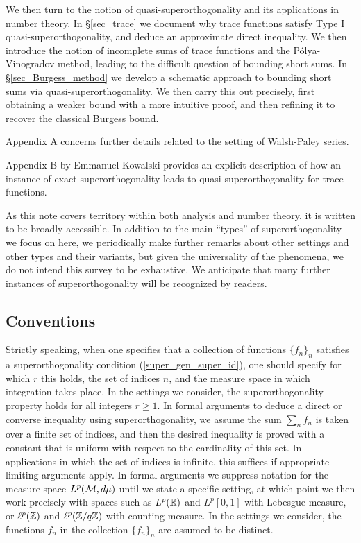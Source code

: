 \documentclass[oneside,11pt]{amsart}
\begin{document}
We then turn to the notion of quasi-superorthogonality and its applications in number theory. In \S \ref{sec_trace} we document why trace functions satisfy Type I quasi-superorthogonality, and deduce an approximate direct inequality. We then  introduce the notion of incomplete sums of trace functions and the P\'olya-Vinogradov method, leading to the difficult question of bounding short sums. In \S \ref{sec_Burgess_method} we develop a schematic approach to bounding short sums via quasi-superorthogonality. We then carry this out precisely, first obtaining a weaker bound with a more intuitive proof, and then refining it to recover the classical Burgess bound.   

Appendix A concerns further details related to the setting of Walsh-Paley series.

Appendix B by Emmanuel Kowalski provides an explicit description of how an instance of exact superorthogonality leads to quasi-superorthogonality for trace functions.
 
 As this note covers territory within both analysis and number theory, it is written to be broadly accessible. In addition to the main ``types'' of superorthogonality we focus on here, we periodically make further remarks about other settings and other types and their variants, but given the universality of the phenomena, we do not intend this survey to be exhaustive. We anticipate that many further instances of superorthogonality will be recognized by readers.

 





\subsection*{Conventions}

Strictly speaking, when one specifies that a collection of functions $\{f_n\}_n$ satisfies a superorthogonality condition (\ref{super_gen_super_id}), one should specify for which $r$ this holds, the set of indices $n$, and   the measure space in which integration takes place. In the settings we consider,  the superorthogonality property   holds for all integers $r \geq 1$.  
In formal arguments to deduce a direct or converse inequality using superorthogonality, we assume the sum $\sum_n f_n$ is taken over a finite set of indices, and then the desired inequality is proved with a constant that is uniform with respect to the cardinality of this set. In applications in which the set of indices is infinite, this  suffices if appropriate limiting arguments apply.
In formal arguments we suppress notation for the measure space $L^p(\mathcal{M},d\mu)$ until we state a specific setting, at which point we then work precisely with spaces such as $L^p(\mathbb{R})$ and $L^p[0,1]$ with Lebesgue measure, or $\ell^p(\mathbb{Z})$ and $\ell^p(\mathbb{Z}/q\mathbb{Z})$ with counting measure. In the settings we consider, the functions $f_n$ in the collection $\{f_n\}_n$ are assumed to be distinct.
\end{document}
